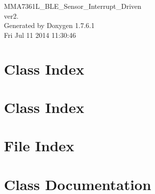 \documentclass[a4paper]{book}
\begin{document}
\hypersetup{pageanchor=false,citecolor=blue}
\begin{titlepage}
\vspace*{7cm}
\begin{center}
{\Large \-M\-M\-A7361\-L\-\_\-\-B\-L\-E\-\_\-\-Sensor\-\_\-\-Interrupt\-\_\-\-Driven \\[1ex]\large ver2. }\\
\vspace*{1cm}
{\large \-Generated by Doxygen 1.7.6.1}\\
\vspace*{0.5cm}
{\small Fri Jul 11 2014 11:30:46}\\
\end{center}
\end{titlepage}
\clearemptydoublepage
{}
\tableofcontents
\clearemptydoublepage
{}
\hypersetup{pageanchor=true,citecolor=blue}
\chapter{\-Class \-Index}

\chapter{\-Class \-Index}

\chapter{\-File \-Index}

\chapter{\-Class \-Documentation}





























\end{document}
